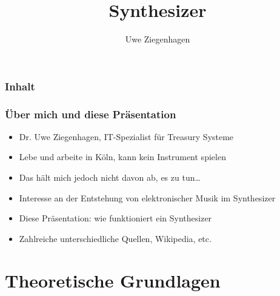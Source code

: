 \documentclass[11pt,ngerman]{beamer}
\author{Uwe Ziegenhagen}
\title{Synthesizer}
\begin{document}
 
 \begin{frame}

\maketitle
 
 \end{frame}
 
 
\begin{frame}
\frametitle{Inhalt}

\tableofcontents

\end{frame}
 
 \begin{frame}
 \frametitle{Über mich und diese Präsentation}
 
\begin{itemize}
 \item Dr. Uwe Ziegenhagen, IT-Spezialist für Treasury Systeme \item Lebe und arbeite in Köln, kann kein Instrument spielen
 \item Das hält mich jedoch nicht davon ab, es zu tun\ldots
 \item Interesse an der Entstehung von elektronischer Musik im Synthesizer
 \item Diese Präsentation: wie funktioniert ein Synthesizer 
 \item Zahlreiche unterschiedliche Quellen, Wikipedia, etc.
\end{itemize}
 \end{frame}
 
\section{Theoretische Grundlagen}

\end{document}
